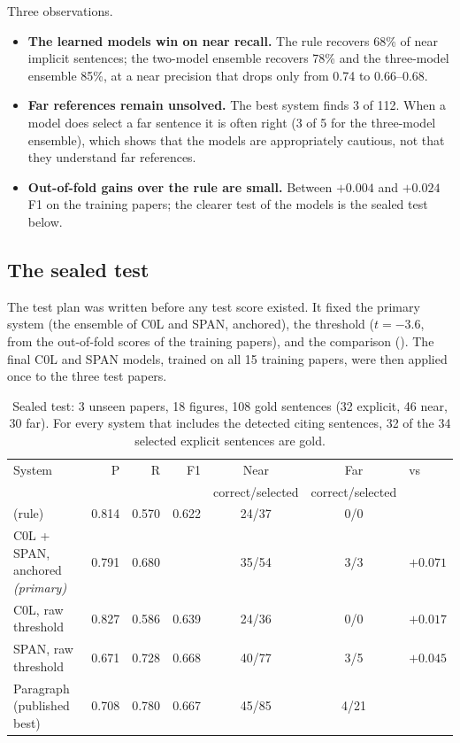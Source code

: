Three observations.
\begin{itemize}
  \item \textbf{The learned models win on near recall.} The rule recovers 68\% of near implicit sentences; the
        two-model ensemble recovers 78\% and the three-model ensemble 85\%, at a near precision that drops
        only from 0.74 to 0.66--0.68.
  \item \textbf{Far references remain unsolved.} The best system finds 3 of 112. When a model does select a
        far sentence it is often right (3 of 5 for the three-model ensemble), which shows that the models are
        appropriately cautious, not that they understand far references.
  \item \textbf{Out-of-fold gains over the rule are small.} Between $+0.004$ and $+0.024$ F1 on the training
        papers; the clearer test of the models is the sealed test below.
\end{itemize}

\subsection{The sealed test}
\label{sec:test}
The test plan was written before any test score existed. It fixed the primary system (the ensemble of C0L and
SPAN, anchored), the threshold ($t=-3.6$, from the out-of-fold scores of the training papers), and the comparison
(\bof{}). The final C0L and SPAN models, trained on all 15
training papers, were then applied once to the three test papers.

\begin{table}[h]
\centering
\footnotesize\setlength{\tabcolsep}{4pt}
\begin{tabularx}{\linewidth}{Lrrrccl}
\toprule
System & P & R & F1 & Near & Far & vs \bof{}\\
       &   &   &    & \scriptsize correct/selected & \scriptsize correct/selected & \\
\midrule
\bof{} (rule)                         & 0.814 & 0.570 & 0.622 & 24/37 & 0/0 & \\
C0L + SPAN, anchored \emph{(primary)} & 0.791 & 0.680 &  & 35/54 & 3/3 & $\mathbf{+0.071}$\\
C0L, raw threshold                    & 0.827 & 0.586 & 0.639 & 24/36 & 0/0 & $+0.017$\\
SPAN, raw threshold                   & 0.671 & 0.728 & 0.668 & 40/77 & 3/5 & $+0.045$\\
\midrule
Paragraph (published best)            & 0.708 & 0.780 & 0.667 & 45/85 & 4/21 & \\
\bottomrule
\end{tabularx}
\caption{Sealed test: 3 unseen papers, 18 figures, 108 gold sentences (32 explicit, 46 near, 30 far). For
every system that includes the detected citing sentences, 32 of the 34 selected explicit sentences are gold.}
\label{tab:test}
\end{table}

